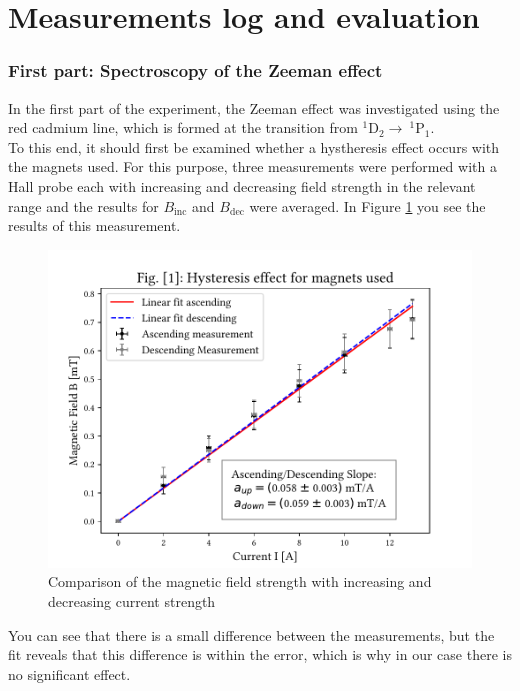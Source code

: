 \section{Measurements log and evaluation}
\subsubsection{First part: Spectroscopy of the Zeeman effect}
In the first part of the experiment, the Zeeman effect was investigated using the red cadmium line, which is formed at the transition from $^1\text{D}_2\rightarrow ~^1\text{P}_1$.\\

To this end, it should first be examined whether a hystheresis effect occurs with the magnets used.
For this purpose, three measurements were performed with a Hall probe each with increasing and decreasing field strength in the relevant range and the results for $B_\text{inc}$ and $B_\text{dec}$ were averaged.
In Figure \ref{fig:hystheresis} you see the results of this measurement.
\begin{figure}[ht]
\centering
\includegraphics[scale=.55]{images//hystheresis.pdf}
\caption{Comparison of the magnetic field strength with increasing and decreasing current strength}
\label{fig:hystheresis}
\end{figure}
You can see that there is a small difference between the measurements, but the fit reveals that this difference is within the error, which is why in our case there is no significant effect.\\

